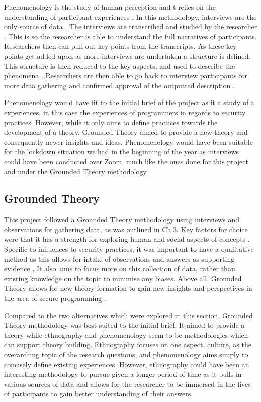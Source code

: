 Phenomenology is the study of human perception and t relies on the understanding of participant experiences \cite{ethno}. In this methodology, interviews are the only source of data \cite{ethno}. The interviews are transcribed and studied by the researcher \cite{ethno}. This is so the researcher is able to understand the full narratives of participants. Researchers then can pull out key points from the transcripts. As these key points get added upon as more interviews are undertaken a structure is defined. This structure is then reduced to the key aspects, and used to describe the phenomena \cite{ethno}. Researchers are then able to go back to interview participants for more data gathering and confirmed approval of the outputted description \cite{ethno}. 
\newline
\par
Phenomenology would have fit to the initial brief of the project as it a study of a experiences, in this case the experiences of programmers in regards to security practices. However, while it only aims to define practices towards the development of a theory, Grounded Theory aimed to provide a new theory and consequently newer insights and ideas. Phenomenology would have been suitable for the lockdown situation we had in the beginning of the year as interviews could have been conducted over Zoom, much like the ones done for this project and under the Grounded Theory methodology. 

\subsection{Grounded Theory}

\par This project followed a Grounded Theory methodology using interviews and observations for gathering data, as was outlined in Ch.3. Key factors for choice were that it has a strength for exploring human and social aspects of concepts \cite{geeks}. Specific to influences to security practices, it was important to have a qualitative method as this allows for intake of observations and answers as supporting evidence \cite{geeks}. It also aims to focus more on this collection of data, rather than existing knowledge on the topic to minimise any biases. Above all, Grounded Theory allows for new theory formation to gain new insights and perspectives in the area of secure programming \cite{geeks}.
\newline
\par
Compared to the two alternatives which were explored in this section, Grounded Theory methodology was best suited to the initial brief. It aimed to provide a theory while ethnography and phenomenology seem to be methodologies which can support theory building. Ethnography focuses on one aspect, culture, as the overarching topic of the research questions, and phenomenology aims simply to concisely define existing experiences. However, ethnography could have been an interesting methodology to pursue given a longer period of time as it pulls in various sources of data and allows for the researcher to be immersed in the lives of participants to gain better understanding of their answers.  

